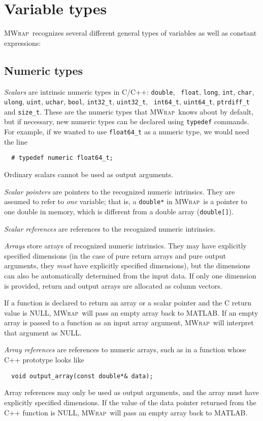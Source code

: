 \documentclass[12pt]{article}
\newcommand{\mwrap}{\textsc{MWrap}}
\begin{document}
\section{Variable types}
\label{type-section}

\mwrap\ recognizes several different general types of variables as well
as constant expressions:


\subsection{Numeric types}

{\it Scalars} are intrinsic numeric types in C/C++: {\tt double}, {\tt
  float}, {\tt long}, {\tt int}, {\tt char}, {\tt ulong}, {\tt uint},
{\tt uchar}, {\tt bool}, {\tt int32\_t}, {\tt uint32\_t}, {\tt
  int64\_t}, {\tt uint64\_t}, {\tt ptrdiff\_t} and {\tt size\_t}.
These are the numeric types that \mwrap\ knows about by default, but
if necessary, new numeric types can be declared using {\tt typedef}
commands.  For example, if we wanted to use {\tt float64\_t} as a
numeric type, we would need the line
\begin{verbatim}
  # typedef numeric float64_t;
\end{verbatim}
Ordinary scalars cannot be used as output arguments.

{\it Scalar pointers} are pointers to the recognized numeric
intrinsics.  They are assumed to refer to {\em one} variable; that
is, a {\tt double*} in \mwrap\ is a pointer to one double in memory,
which is different from a double array ({\tt double[]}).

{\it Scalar references} are references to the recognized numeric
intrinsics.

{\it Arrays} store arrays of recognized numeric intrinsics.
They may have explicitly specified dimensions (in the case of pure
return arrays and pure output arguments, they \emph{must} have explicitly
specified dimensions), but the dimensions can also be automatically
determined from the input data.  If only one dimension is provided,
return and output arrays are allocated as column vectors.

If a function is declared to return an array or a scalar pointer
and the C return value is NULL, \mwrap\ will pass an empty array
back to MATLAB.  If an empty array is passed to a function as an
input array argument, \mwrap\ will interpret that argument as NULL.

{\it Array references} are references to numeric arrays, such
as in a function whose C++ prototype looks like
\begin{verbatim}
  void output_array(const double*& data);
\end{verbatim}
Array references may only be used as output arguments, and the array
must have explicitly specified dimensions.  If the value of the data
pointer returned from the C++ function is NULL, \mwrap\ will pass an
empty array back to MATLAB.
\end{document}
